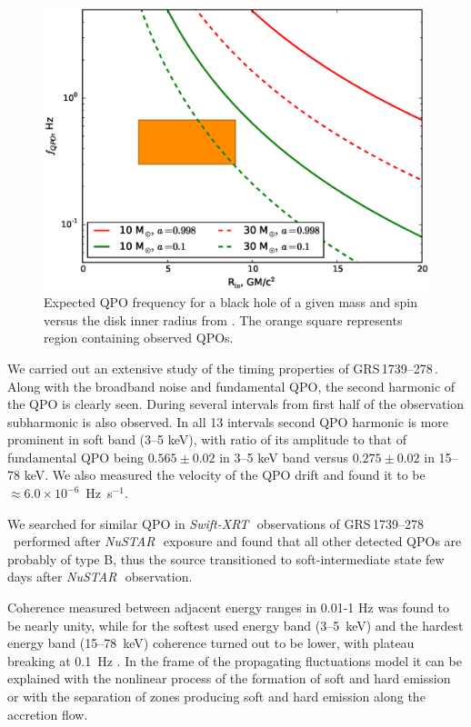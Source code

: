\documentclass[a4paper,fleqn,usenatbib]{mnras}
\def\grs{{GRS\,1739--278\,}}
\def\swiftx{{\em Swift-XRT\,}}
\def\nustar{{\em NuSTAR\,}}
\begin{document}
\begin{figure}
        \includegraphics[width=\columnwidth]{qpoconstr_v03.eps}
        \caption{Expected QPO frequency for a black hole of a given mass and spin versus the disk inner radius from \protect\cite{ingram14}. The orange square represents region containing observed QPOs.}
        \label{fig:qpoconstr}
\end{figure}

We carried out an extensive study of the timing properties of \grs. 
Along with the broadband noise and fundamental QPO, the second harmonic of the QPO is clearly seen. 
During several intervals from first half of the observation subharmonic is also observed. 
In all 13 intervals second QPO harmonic is more prominent in soft band (3--5 keV), with ratio of its amplitude to that of fundamental QPO being $0.565\pm0.02$ in 3--5 keV band versus $0.275\pm0.02$ in 15--78 keV.
We also measured the velocity of the QPO drift and found it to be $\approx6.0\times10^{-6}$~Hz~s$^{-1}$. 

We searched for similar QPO in \swiftx\ observations of \grs\ performed after \nustar\, exposure and found that all other detected QPOs are probably of type B, thus the source transitioned to soft-intermediate state few days after \nustar\ observation.

Coherence measured between adjacent energy ranges in 0.01-1 Hz was found to be nearly unity, while for the softest used energy band (3--5~keV) and the hardest energy band (15--78~keV) coherence turned out to be lower, with plateau breaking at 0.1~Hz . 
In the frame of the propagating fluctuations model it can be explained with the nonlinear process of the formation of soft and hard emission or with the separation of zones producing soft and hard emission along the accretion flow.
\end{document}

